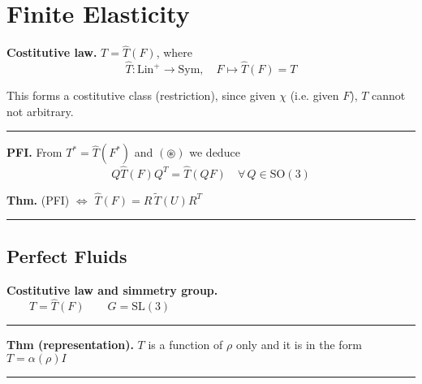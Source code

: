 
\vspace{-1em}


\section{\texorpdfstring{\color{red}Finite Elasticity}{}}


\textbf{Costitutive law.} $T=\hat{T}(F)$, where
\begin{equation*}
\hat{T}:\text{Lin}^+\to\text{Sym},\quad F\mapsto \hat{T}(F)=T
\end{equation*}

This forms a costitutive class (restriction), since given $\chi$ (i.e. given $F$), $T$ cannot not arbitrary. 

\rule{0.31\textwidth}{0.2pt}
\smallskip

\textbf{PFI.} From $T^*=\hat{T}(F^*)$ and $(\circledast)$ we deduce
\begin{equation*}
\boxed{Q\hat{T}(F)Q^T=\hat{T}(QF)\quad \forall\,Q\in\text{SO}(3)}
\end{equation*}

\textbf{Thm.} (PFI) $\Longleftrightarrow$ $\hat{T}(F)=R\,\widetilde{T}(U)R^T$

\rule{0.31\textwidth}{0.2pt}


\subsection{\texorpdfstring{\color{red}Perfect Fluids}{}}


\textbf{Costitutive law and simmetry group.} \\
$\qquad T=\hat{T}(F)\qquad G=\text{SL}(3)$

\rule{0.31\textwidth}{0.2pt}
\smallskip

\textbf{Thm (representation).} $T$ is a function of $\rho$ only and it is in the form $\boxed{T=\alpha(\rho)I}$

\rule{0.31\textwidth}{0.2pt}

